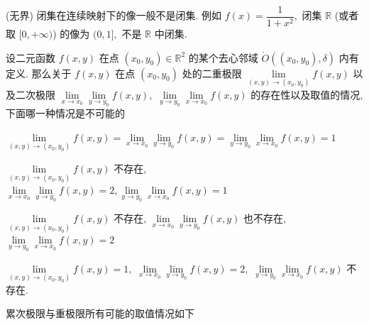 \begin{solution}
(无界) 闭集在连续映射下的像一般不是闭集. 例如 $f(x) = \dfrac{1}{1 + x^2},$ 闭集 $\mathbb{R}$ (或者取 $[0, +\infty)$) 的像为 $(0, 1],$ 不是 $\mathbb{R}$ 中闭集.
\end{solution}

\begin{question}
设二元函数 $f(x, y)$ 在点 $(x_0, y_0) \in \mathbb{R}^2$ 的某个去心邻域 $\mathring{O}((x_0, y_0), \delta)$ 内有定义. 那么关于 $f(x, y)$ 在点 $(x_0, y_0)$ 处的二重极限 $\lim\limits_{(x,y)\to(x_0,y_0)} f(x,y)$ 以及二次极限 $\lim\limits_{x \to x_0} \lim\limits_{y \to y_0} f(x,y),$ $\lim\limits_{y \to y_0} \lim\limits_{x \to x_0} f(x,y)$ 的存在性以及取值的情况, 下面哪一种情况是不可能的 \paren[D]

\begin{choices}
\item $\lim\limits_{(x,y)\to(x_0,y_0)} f(x,y) = \lim\limits_{x \to x_0} \lim\limits_{y \to y_0} f(x,y) = \lim\limits_{y \to y_0} \lim\limits_{x \to x_0} f(x,y) = 1$
\item $\lim\limits_{(x,y)\to(x_0,y_0)} f(x,y)$ 不存在, $\lim\limits_{x \to x_0} \lim\limits_{y \to y_0} f(x,y) = 2, \lim\limits_{y \to y_0} \lim\limits_{x \to x_0} f(x,y) = 1$
\item $\lim\limits_{(x,y)\to(x_0,y_0)} f(x,y)$ 不存在, $\lim\limits_{x \to x_0} \lim\limits_{y \to y_0} f(x,y)$ 也不存在, $\lim\limits_{y \to y_0} \lim\limits_{x \to x_0} f(x,y) = 2$
\item $\lim\limits_{(x,y)\to(x_0,y_0)} f(x,y) = 1,$ $\lim\limits_{x \to x_0} \lim\limits_{y \to y_0} f(x,y) = 2,$ $\lim\limits_{y \to y_0} \lim\limits_{x \to x_0} f(x,y)$ 不存在.
\end{choices}
\end{question}

\begin{solution}
累次极限与重极限所有可能的取值情况如下

\begin{table}[H]
\centering

\end{table}
\end{solution}


